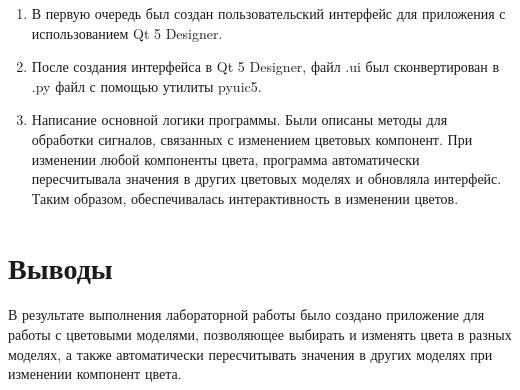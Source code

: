 \documentclass{article}
\begin{document}
    \begin{enumerate}
        \item В первую очередь был создан пользовательский интерфейс для приложения с использованием Qt 5 Designer.

        \item После создания интерфейса в Qt 5 Designer, файл .ui был сконвертирован в .py файл с помощью утилиты pyuic5.

        \item Написание основной логики программы.
        Были описаны методы для обработки сигналов, связанных с изменением цветовых компонент.
        При изменении любой компоненты цвета, программа автоматически пересчитывала значения в других цветовых моделях и обновляла интерфейс.
        Таким образом, обеспечивалась интерактивность в изменении цветов.

    \end{enumerate}

    \section{Выводы}
    В результате выполнения лабораторной работы было создано приложение для работы с цветовыми моделями, позволяющее выбирать и изменять цвета в разных моделях, а также автоматически пересчитывать значения в других моделях при изменении компонент цвета.
\end{document}
